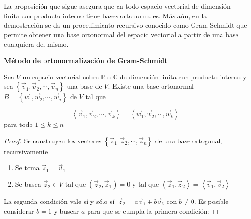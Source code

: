 \bigskip

\bigskip

La proposición que sigue asegura que en todo espacio vectorial de dimensión finita con producto interno tiene  bases ortonormales. Más aún, en la demostración se da un procedimiento recursivo conocido como Gram-Schmidt que permite obtener una base ortonormal del espacio vectorial a partir de una base cualquiera del mismo.


\bigskip

\begin{theorem}
\textbf{ Método de ortonormalización de Gram-Schmidt}  

\bigskip

Sea $V$ un espacio vectorial sobre $\mathbb{R}$ o $\mathbb{C}$ de dimensión finita con producto interno y sea $\left\{\vec{v}_1,\vec{v}_2,\cdots, \vec{v}_n\right\}$ una base de $V$. Existe una base ortonormal $B= \left\{\vec{w}_1,\vec{w}_2,\cdots, \vec{w}_n\right\}$ de $V$ tal que 

$$\left\langle \vec{v}_1,\vec{v}_2,\cdots, \vec{v}_k \right\rangle  = \left\langle \vec{w}_1,\vec{w}_2,\cdots, \vec{w}_k \right\rangle $$
para todo $1\leq k \leq n$



\begin{proof}

Se construyen los vectores  $\left\{\vec{z}_1,\vec{z}_2,\cdots, \vec{z}_n\right\}$ de una base ortogonal, recursivamente



\begin{enumerate}

\item Se toma $\vec{z}_1=\vec{v}_1$  

\bigskip

\item  Se busca $\vec{z}_2 \in V$ tal que $(\vec{z}_2, \vec{z}_1)=0$ y tal que 
$\left\langle \vec{z}_1,\vec{z}_2\right\rangle=\left\langle \vec{v}_1,\vec{v}_2\right\rangle$




\end{enumerate}

\bigskip


La segunda condición vale sí y sólo sí $~\vec{z}_2=a\vec{v}_1+b\vec{v}_2$ con $b\neq 0$. Es  posible considerar $b=1$ y buscar $a$ para que se cumpla la primera condición:


\end{proof}
\end{theorem}

